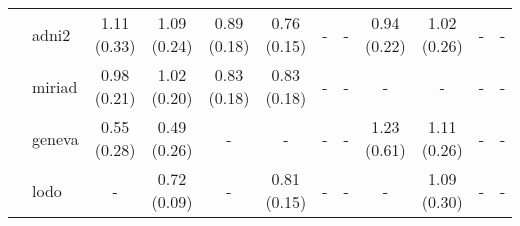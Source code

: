 \begin{table*}
{\begin{tabular}{llcccccccccc}
       & adni2 &  1.11 (0.33) &  1.09 (0.24) &  0.89 (0.18) &  0.76 (0.15) &            - &            - &  0.94 (0.22) &  1.02 (0.26) &            - &            - \\
       & miriad &  0.98 (0.21) &  1.02 (0.20) &  0.83 (0.18) &  0.83 (0.18) &            - &            - &            - &            - &            - &            - \\
       & geneva &  0.55 (0.28) &  0.49 (0.26) &            - &            - &            - &            - &  1.23 (0.61) &  1.11 (0.26) &            - &            - \\
\cmidrule(lr){2-12}
       & lodo &            - &  0.72 (0.09) &            - &  0.81 (0.15) &            - &            - &            - &  1.09 (0.30) &            - &            - \\
\bottomrule
\end{tabular}}
\end{table*}
